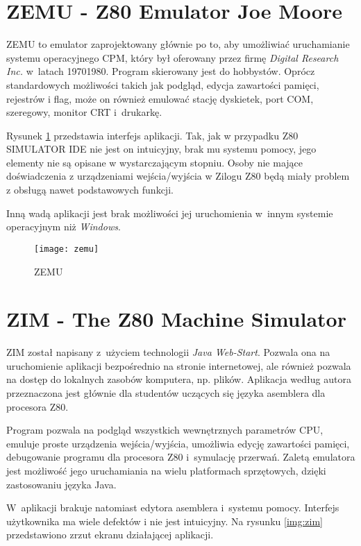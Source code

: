 	
	\section{ZEMU - Z80 Emulator Joe Moore}
	ZEMU to emulator zaprojektowany głównie po to, aby umożliwiać uruchamianie systemu operacyjnego CPM, który był oferowany przez firmę \emph{Digital Research Inc.} w~latach 1970{\dywiz}1980\cite{cpm}. Program skierowany jest do hobbystów. Oprócz standardowych możliwości takich jak podgląd, edycja zawartości pamięci, rejestrów i flag, może on również emulować stację dyskietek, port COM, szeregowy, monitor CRT i~drukarkę.    
	
	Rysunek \ref{img:zemu} przedstawia interfejs aplikacji. Tak, jak w przypadku Z80 SIMULATOR IDE nie jest on intuicyjny, brak mu systemu pomocy, jego elementy nie są opisane w wystarczającym stopniu. Osoby nie mające doświadczenia z urządzeniami wejścia/wyjścia w Zilogu Z80 będą miały problem z obsługą nawet podstawowych funkcji.
	
	Inną wadą aplikacji jest brak możliwości jej uruchomienia w~innym systemie operacyjnym niż \emph{Windows}. 
	
	\begin{figure}[h]		
		\centering
		\texttt{[image: zemu]}
		\caption{ZEMU}
		\label{img:zemu}
	\end{figure}
	
	 \section{ZIM - The Z80 Machine Simulator}
	ZIM został napisany z~użyciem technologii \emph{Java Web-Start}. Pozwala ona na uruchomienie aplikacji bezpośrednio na stronie internetowej, ale również pozwala na dostęp do lokalnych zasobów komputera, np. plików. 
	Aplikacja według autora przeznaczona jest głównie dla studentów uczących się języka asemblera dla procesora Z80\cite{zimManual}.
	
	Program pozwala na podgląd wszystkich wewnętrznych parametrów CPU, emuluje proste urządzenia wejścia/wyjścia, umożliwia edycję zawartości pamięci, debugowanie programu dla procesora Z80 i~symulację przerwań. Zaletą emulatora jest możliwość jego uruchamiania na wielu platformach sprzętowych, dzięki zastosowaniu języka Java.
	
	W~aplikacji brakuje natomiast edytora asemblera i~systemu pomocy. Interfejs użytkownika ma wiele defektów i nie jest intuicyjny. Na rysunku \ref{img:zim} przedstawiono zrzut ekranu działającej aplikacji.
	
